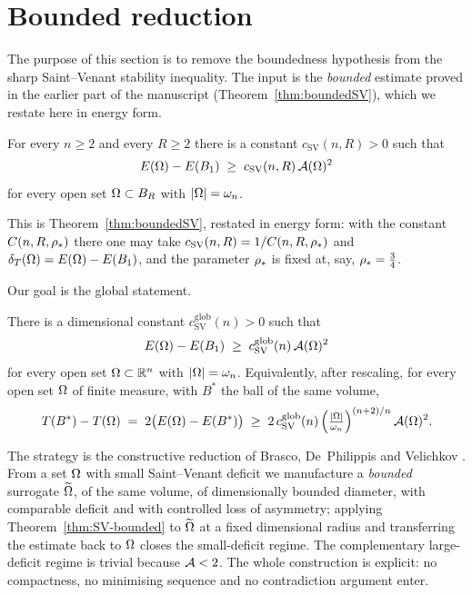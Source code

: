 
\section{Bounded reduction}\label{sec:bddred}

The purpose of this section is to remove the boundedness hypothesis from
the sharp Saint--Venant stability inequality. The input is the
\emph{bounded} estimate proved in the earlier part of the manuscript
(Theorem~\ref{thm:boundedSV}), which we restate here in energy form.

\begin{theorem}\label{thm:SV-bounded}
For every $n\ge2$ and every $R\ge2$ there is a constant
$c_{\mathrm{SV}}(n,R)>0$ such that
\begin{equation}\label{eq:SV-bounded}
   E(\Omega)-E(B_1)\;\ge\;c_{\mathrm{SV}}(n,R)\,\mathcal A(\Omega)^2
\end{equation}
for every open set $\Omega\subset B_R$ with $\left|\Omega\right|=\omega_n$.
\end{theorem}

This is Theorem~\ref{thm:boundedSV}, restated in energy form: with the
constant $C(n,R,\rho_*)$ there one may take
$c_{\mathrm{SV}}(n,R)=1/C(n,R,\rho_*)$ and
$\delta_T(\Omega)=E(\Omega)-E(B_1)$, and the parameter $\rho_*$ is fixed at, say,
$\rho_*=\tfrac34$.

Our goal is the global statement.

\begin{theorem}\label{thm:SV-global}
There is a dimensional constant $c_{\mathrm{SV}}^{\mathrm{glob}}(n)>0$
such that
\begin{equation}\label{eq:SV-global}
   E(\Omega)-E(B_1)\;\ge\;c_{\mathrm{SV}}^{\mathrm{glob}}(n)\,\mathcal A(\Omega)^2
\end{equation}
for every open set $\Omega\subset\mathbb R^n$ with $\left|\Omega\right|=\omega_n$.
Equivalently, after rescaling, for every open set $\Omega$ of finite
measure, with $B^*$ the ball of the same volume,
\begin{equation}\label{eq:T-global}
   T(B^*)-T(\Omega)\;=\;2\bigl(E(\Omega)-E(B^*)\bigr)\;\ge\;
   2\,c_{\mathrm{SV}}^{\mathrm{glob}}(n)\,
   \Bigl(\tfrac{\left|\Omega\right|}{\omega_n}\Bigr)^{(n+2)/n}\,\mathcal A(\Omega)^2 .
\end{equation}
\end{theorem}

The strategy is the constructive reduction of Brasco, De~Philippis and
Velichkov \cite[\S5]{BDV}. From a set $\Omega$ with small Saint--Venant
deficit we manufacture a \emph{bounded} surrogate $\widetilde{\Omega}$, of the same
volume, of dimensionally bounded diameter, with comparable deficit and
with controlled loss of asymmetry; applying
Theorem~\ref{thm:SV-bounded} to $\widetilde{\Omega}$ at a fixed dimensional radius
and transferring the estimate back to $\Omega$ closes the small-deficit
regime. The complementary large-deficit regime is trivial because
$\mathcal A<2$. The whole construction is explicit: no compactness, no
minimising sequence and no contradiction argument enter.

